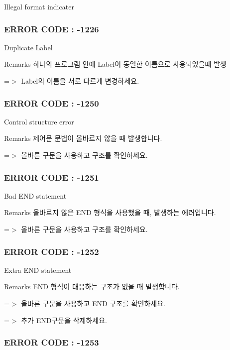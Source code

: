 Illegal format indicater



 \subsubsection*{E\-R\-R\-O\-R C\-O\-D\-E \-: -\/1226 }

Duplicate Label \begin{DoxyRemark}{Remarks}
하나의 프로그램 안에 Label이 동일한 이름으로 사용되었을때 발생 \par
 =$>$ Label의 이름을 서로 다르게 변경하세요.
\end{DoxyRemark}


 \subsubsection*{E\-R\-R\-O\-R C\-O\-D\-E \-: -\/1250 }

Control structure error \begin{DoxyRemark}{Remarks}
제어문 문법이 올바르지 않을 때 발생합니다. \par
 =$>$ 올바른 구문을 사용하고 구조를 확인하세요.
\end{DoxyRemark}


 \subsubsection*{E\-R\-R\-O\-R C\-O\-D\-E \-: -\/1251 }

Bad E\-N\-D statement \begin{DoxyRemark}{Remarks}
올바르지 않은 E\-N\-D 형식을 사용했을 때, 발생하는 에러입니다. \par
 =$>$ 올바른 구문을 사용하고 구조를 확인하세요.
\end{DoxyRemark}


 \subsubsection*{E\-R\-R\-O\-R C\-O\-D\-E \-: -\/1252 }

Extra E\-N\-D statement \begin{DoxyRemark}{Remarks}
E\-N\-D 형식이 대응하는 구조가 없을 때 발생합니다. \par
 =$>$ 올바른 구문을 사용하고 E\-N\-D 구조를 확인하세요. \par
 =$>$ 추가 E\-N\-D구문을 삭제하세요.
\end{DoxyRemark}


 \subsubsection*{E\-R\-R\-O\-R C\-O\-D\-E \-: -\/1253 }

